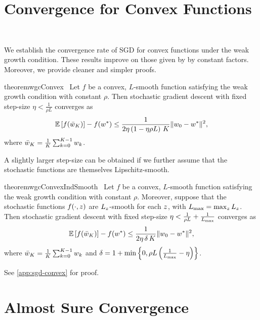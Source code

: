 \section{Convergence for Convex Functions}~\label{sec:sgd-convex}

We establish the convergence rate of SGD for convex functions under the weak growth condition. These results improve on those given by \citet{vaswani2019fast} by constant factors. 
Moreover, we provide cleaner and simpler proofs.


\begin{restatable}{theorem}{wgcConvex}~\label{thm:wgc-convex}
    Let \( f \) be a convex, \( L \)-smooth function satisfying the weak growth condition with constant \( \rho  \).
    Then stochastic gradient descent with fixed step-size \( \eta < \frac{1}{\rho L} \) converges as
    \[ \mathbb{E}\left[f(\bar {w}_K)\right] - f(w^*) \leq \frac{1}{2 \eta \left(1 - \eta \rho L\right) \, K} \|w_0 - w^*\|^2, \]
    where \( \bar {w}_K = \frac{1}{K} \sum_{k=0}^{K-1} w_k \). 
\end{restatable}

A slightly larger step-size can be obtained if we further assume that the stochastic functions are themselves Lipschitz-smooth.

\begin{restatable}{theorem}{wgcConvexIndSmooth}~\label{thm:wgc-convex-ind-smooth}
    Let \( f \) be a convex, \( L \)-smooth function satisfying the weak growth condition with constant \( \rho  \).
    Moreover, suppose that the stochastic functions \( f(\cdot, z) \) are \( L_z \)-smooth for each \( z \), with \( L_{\text{max}} = \max_z L_z \).
    Then stochastic gradient descent with fixed step-size \( \eta < \frac{1}{\rho L} + \frac{1}{L_{\text{max}}} \) converges as
    \[ \mathbb{E}\left[f(\bar w_K)\right] - f(w^*) \leq \frac{1}{2\eta \, \delta \, K} \|w_0 - w^*\|^2,   \]
    where \( \bar {w}_K = \frac{1}{K} \sum_{k=0}^{K-1} w_k \) and \( \delta = 1 + \min \left\{ 0, \rho L \left(\frac{1}{L_{\text{max}}} - \eta \right)\right\} \). 
\end{restatable}

See \autoref{app:sgd-convex} for proof.

\section{Almost Sure Convergence}

